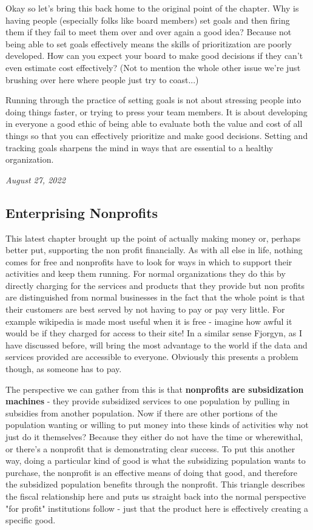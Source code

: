 \documentclass[10pt,a5paper]{book}
\begin{document}
Okay so let's bring this back home to the original point of the chapter. Why is having people (especially folks like board members) set goals and then firing them if they fail to meet them over and over again a good idea? Because not being able to set goals effectively means the skills of prioritization are poorly developed. How can you expect your board to make good decisions if they can't even estimate cost effectively? (Not to mention the whole other issue we're just brushing over here where people just try to coast...)

Running through the practice of setting goals is not about stressing people into doing things faster, or trying to press your team members. It is about developing in everyone a good ethic of being able to evaluate both the value and cost of all things so that you can effectively prioritize and make good decisions. Setting and tracking goals sharpens the mind in ways that are essential to a healthy organization. 

\textit{August 27, 2022}

\subsection{Enterprising Nonprofits}

This latest chapter brought up the point of actually making money or, perhaps better put, supporting the non profit financially. As with all else in life, nothing comes for free and nonprofits have to look for ways in which to support their activities and keep them running. For normal organizations they do this by directly charging for the services and products that they provide but non profits are distinguished from normal businesses in the fact that the whole point is that their customers are best served by not having to pay or pay very little. For example wikipedia is made most useful when it is free - imagine how awful it would be if they charged for access to their site! In a similar sense Fjorgyn, as I have discussed before, will bring the most advantage to the world if the data and services provided are accessible to everyone. Obviously this presents a problem though, as someone has to pay.

The perspective we can gather from this is that \textbf{nonprofits are subsidization machines} - they provide subsidized services to one population by pulling in subsidies from another population. Now if there are other portions of the population wanting or willing to put money into these kinds of activities why not just do it themselves? Because they either do not have the time or wherewithal, or there's a nonprofit that is demonstrating clear success. To put this another way, doing a particular kind of good is what the subsidizing population wants to purchase, the nonprofit is an effective means of doing that good, and therefore the subsidized population benefits through the nonprofit. This triangle describes the fiscal relationship here and puts us straight back into the normal perspective "for profit" institutions follow - just that the product here is effectively creating a specific good.  
\end{document}
